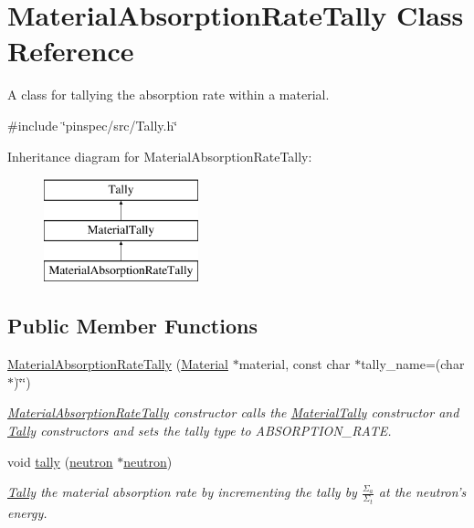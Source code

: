 \hypertarget{classMaterialAbsorptionRateTally}{\section{Material\-Absorption\-Rate\-Tally Class Reference}
\label{classMaterialAbsorptionRateTally}
}


A class for tallying the absorption rate within a material.  




{\ttfamily \#include \char`\"{}pinspec/src/\-Tally.\-h\char`\"{}}

Inheritance diagram for Material\-Absorption\-Rate\-Tally\-:\begin{figure}[H]
\begin{center}
\leavevmode
\includegraphics[height=3.000000cm]{classMaterialAbsorptionRateTally}
\end{center}
\end{figure}
\subsection*{Public Member Functions}
\begin{DoxyCompactItemize}
\item 
\hyperlink{classMaterialAbsorptionRateTally_a7623b08604df21dc42cd3da035d9bba6}{Material\-Absorption\-Rate\-Tally} (\hyperlink{classMaterial}{Material} $\ast$material, const char $\ast$tally\-\_\-name=(char $\ast$)\char`\"{}\char`\"{})
\begin{DoxyCompactList}\small\item\em \hyperlink{classMaterialAbsorptionRateTally}{Material\-Absorption\-Rate\-Tally} constructor calls the \hyperlink{classMaterialTally}{Material\-Tally} constructor and \hyperlink{classTally}{Tally} constructors and sets the tally type to A\-B\-S\-O\-R\-P\-T\-I\-O\-N\-\_\-\-R\-A\-T\-E. \end{DoxyCompactList}\item 
void \hyperlink{classMaterialAbsorptionRateTally_a86c4e2653f1baf2b862ce9d3043a888e}{tally} (\hyperlink{structneutron}{neutron} $\ast$\hyperlink{structneutron}{neutron})
\begin{DoxyCompactList}\small\item\em \hyperlink{classTally}{Tally} the material absorption rate by incrementing the tally by $ \frac{\Sigma_a}{\Sigma_t} $ at the neutron's energy. \end{DoxyCompactList}\end{DoxyCompactItemize}
